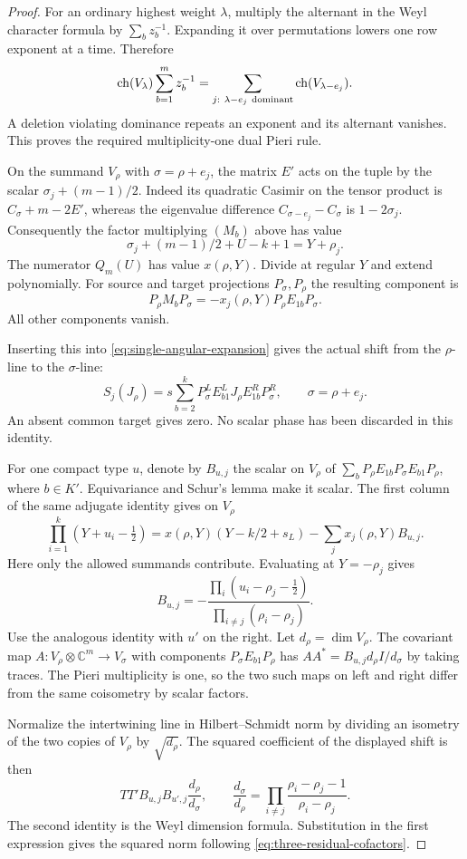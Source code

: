 \begin{proof}
For an ordinary highest weight \(\lambda\), multiply the alternant in
the Weyl character formula by \(\sum_b z_b^{-1}\). Expanding it
over permutations lowers one row exponent at a time. Therefore
\[
 \operatorname{ch}(V_\lambda)\sum_{b=1}^m z_b^{-1}
      =\sum_{j:\ \lambda-e_j\ {\rm dominant}}
                        \operatorname{ch}(V_{\lambda-e_j}).
\]
A deletion violating dominance repeats an exponent and its alternant
vanishes. This proves the required multiplicity-one dual Pieri rule.

On the summand
\(V_\rho\) with \(\sigma=\rho+e_j\), the matrix \(E'\) acts
on the tuple by the scalar \(\sigma_j+(m-1)/2\).
Indeed its quadratic Casimir on the tensor product is
\(C_\sigma+m-2E'\), whereas the eigenvalue difference
\(C_{\sigma-e_j}-C_\sigma\) is \(1-2\sigma_j\).
Consequently the factor multiplying \((M_b)\) above has value
\[
     \sigma_j+(m-1)/2+U-k+1=Y+\rho_j .
\]
The numerator \(Q_m(U)\) has value \(x(\rho,Y)\). Divide at
regular \(Y\) and extend polynomially. For source and target
projections \(P_\sigma,P_\rho\) the resulting component is
\[
 P_\rho M_b P_\sigma=-x_j(\rho,Y)P_\rho E_{1b}P_\sigma .
\]
All other components vanish.

Inserting this into
\eqref{eq:single-angular-expansion} gives the actual shift
from the \(\rho\)-line to the \(\sigma\)-line:
\[
 S_j(J_\rho)=s\sum_{b=2}^k
      P^L_\sigma E^L_{b1}J_\rho E^R_{1b}P^R_\sigma ,
 \qquad \sigma=\rho+e_j .
\]
An absent common target gives zero. No scalar phase has been
discarded in this identity.

For one compact type \(u\), denote by \(B_{u,j}\) the scalar on
\(V_\rho\) of \(\sum_b P_\rho E_{1b}P_\sigma E_{b1}P_\rho\),
where \(b\in K'\). Equivariance and Schur's lemma make it scalar.
The first column of the same adjugate identity gives on \(V_\rho\)
\[
 \prod_{i=1}^k(Y+u_i-\tfrac12)
 =x(\rho,Y)(Y-k/2+s_L)
                -\sum_j x_j(\rho,Y) B_{u,j}.
\]
Here only the allowed summands contribute. Evaluating at
\(Y=-\rho_j\) gives
\[
 B_{u,j}=-\frac{\prod_i(u_i-\rho_j-\tfrac12)}
                    {\prod_{i\ne j}(\rho_i-\rho_j)} .
\]
Use the analogous identity with \(u'\) on the right. Let
\(d_\rho=\dim V_\rho\). The covariant map
\(A:V_\rho\otimes\mathbb C^m\to V_\sigma\) with components
\(P_\sigma E_{b1}P_\rho\) has
\(A A^*=B_{u,j}d_\rho I/d_\sigma\) by taking traces. The
Pieri multiplicity is one, so the two such maps on left and right
differ from the same coisometry by scalar factors.

Normalize the intertwining line in Hilbert--Schmidt norm by dividing
an isometry of the two copies of \(V_\rho\) by \(\sqrt{d_\rho}\).
The squared coefficient of the displayed shift is then
\[
 TT' B_{u,j} B_{u',j}\frac{d_\rho}{d_\sigma},
 \qquad
 \frac{d_\sigma}{d_\rho}
   =\prod_{i\ne j}\frac{\rho_i-\rho_j-1}{\rho_i-\rho_j}.
\]
The second identity is the Weyl dimension formula. Substitution
in the first expression gives the squared norm following
\eqref{eq:three-residual-cofactors}.


\end{proof}
